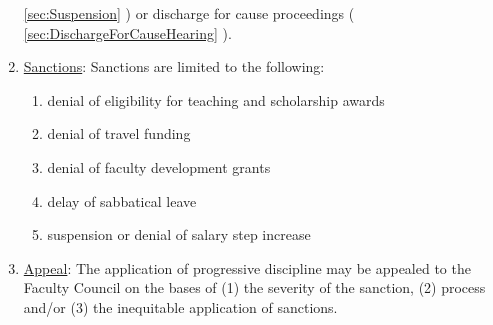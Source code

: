 \begin{enumerate}[label=\alph*)]
{\begin{enumerate}[label=\arabic*)]
{								\ref{sec:Suspension}
								) or discharge for cause proceedings (
								\ref{sec:DischargeForCauseHearing}
								).}
						\end{enumerate}
					}
					\item{\underline{Sanctions}:
						\label{par:NonPerformanceOfContract-Sanctions}
						Sanctions are limited to the following:
						\begin{enumerate}[label=\arabic*)]
							\item{denial of eligibility for teaching and scholarship awards}
							\item{denial of travel funding}
							\item{denial of faculty development grants}
							\item{delay of sabbatical leave}
							\item{suspension or denial of salary step increase}
						\end{enumerate}
					}
					\item{\underline{Appeal}:
						The application of progressive discipline may be appealed to the Faculty Council on the bases of (1) the severity of the sanction, (2) process and/or (3) the inequitable application of sanctions.}
				\end{enumerate}
